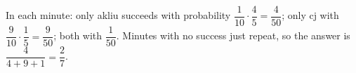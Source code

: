 In each minute: only akliu succeeds with probability $\dfrac1{10}\cdot\dfrac45=\dfrac4{50}$; only cj with $\dfrac9{10}\cdot\dfrac15=\dfrac9{50}$; both with $\dfrac1{50}$. Minutes with no success just repeat, so the answer is $\dfrac{4}{4+9+1}=\boxed{\dfrac27}$.
